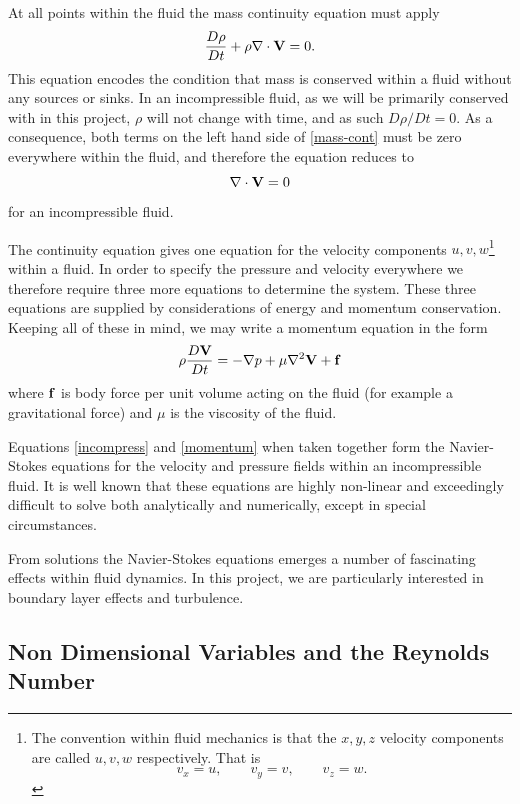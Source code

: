 At all points within the fluid the mass continuity equation must apply
\begin{equation} \label{mass-cont}
\frac{D\rho}{Dt} + \rho \nabla \cdot \mathbf{V} = 0 .
\end{equation}
This equation encodes the condition that mass is conserved within a fluid without any sources or sinks.
In an incompressible fluid, as we will be primarily conserved with in this project, $\rho$ will not
change with time, and as such $D \rho / D t = 0$. As a consequence, both terms on the left hand side of
\eqref{mass-cont} must be zero everywhere within the fluid, and therefore the equation reduces to
\begin{equation} \label{incompress}
\nabla \cdot \mathbf{V} = 0
\end{equation}
for an incompressible fluid.

The continuity equation gives one equation for the velocity components $u,v,w$\footnote{
	The convention within fluid mechanics is that the $x,y,z$ velocity components are called $u,v,w$
	respectively. That is \[
		v_x = u, \qquad v_y = v, \qquad v_z = w .
	\]
} within a fluid. In order to specify the pressure and velocity everywhere we therefore require three
more equations to determine the system. These three equations are supplied by considerations of
energy and momentum conservation. Keeping all of these in mind, we may write a
momentum equation in the form
\begin{equation} \label{momentum}
\rho \frac{D\mathbf{V}}{Dt} = - \nabla p + \mu \nabla^2 \mathbf{V} + \mathbf{f}
\end{equation}
where $\mathbf{f}$ is body force per unit volume acting on the fluid (for example a gravitational force) 
and $\mu$ is the viscosity of the fluid.

Equations \eqref{incompress} and \eqref{momentum} when taken together form the Navier-Stokes equations
for the velocity and pressure fields within an incompressible fluid. It is well known that these
equations are highly non-linear and exceedingly difficult to solve both analytically and numerically,
except in special circumstances.

From solutions the Navier-Stokes equations emerges a number of fascinating effects within fluid 
dynamics. In this project, we are particularly interested in boundary layer effects and turbulence.

\subsection{Non Dimensional Variables and the Reynolds Number}

